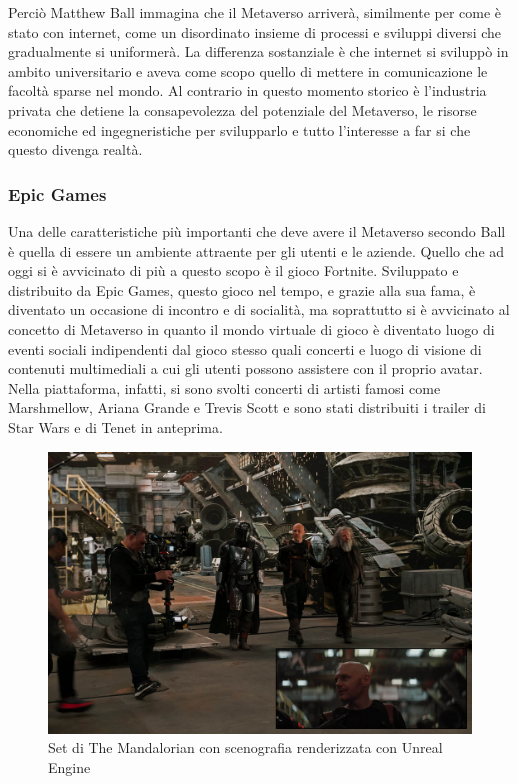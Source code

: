     Perciò Matthew Ball immagina che il Metaverso arriverà, similmente per come è stato con internet, come un disordinato insieme di processi e sviluppi diversi che gradualmente si uniformerà.
    La differenza sostanziale è che internet si sviluppò in ambito universitario e aveva come scopo quello di mettere in comunicazione le facoltà sparse nel mondo.
    Al contrario in questo momento storico è l'industria privata che detiene la consapevolezza del potenziale del Metaverso, le risorse economiche ed ingegneristiche per svilupparlo e tutto l'interesse a far si che questo divenga realtà.

        \subsubsection{Epic Games} \label{EpicGames}

        Una delle caratteristiche più importanti che deve avere il Metaverso secondo Ball è quella di essere un ambiente attraente per gli utenti e le aziende.
        Quello che ad oggi si è avvicinato di più a questo scopo è il gioco Fortnite.
        Sviluppato e distribuito da Epic Games, questo gioco nel tempo, e grazie alla sua fama, è diventato un occasione di incontro e di socialità, ma soprattutto si è avvicinato al concetto di Metaverso in quanto il mondo virtuale di gioco è diventato luogo di eventi sociali indipendenti dal gioco stesso quali concerti e luogo di visione di contenuti multimediali a cui gli utenti possono assistere con il proprio avatar.
        Nella piattaforma, infatti, si sono svolti concerti di artisti famosi come Marshmellow, Ariana Grande e Trevis Scott e sono stati distribuiti i trailer di Star Wars e di Tenet in anteprima.

        \begin{figure}[b]
            \centering
            \includegraphics[width=.9\textwidth]{figure/TheMandalorianUnreal.jpg}
            \caption{Set di The Mandalorian con scenografia renderizzata con Unreal Engine}
        \end{figure}

